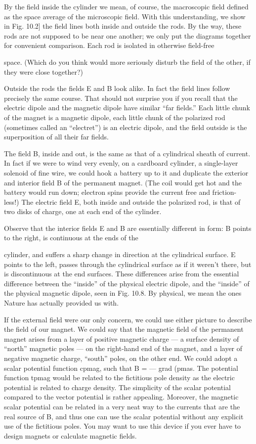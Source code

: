 {{By the field inside the cylinder we mean, of course, the macroscopic
field defined as the space average of the microscopic field.
With this understanding, we show in Fig. 10.2] the field lines both
inside and outside the rods. By the way, these rods are not supposed
to be near one another; we only put the diagrams together for convenient
comparison. Each rod is isolated in otherwise field-free

space. (Which do you think would more seriously disturb the field
of the other, if they were close together?)

Outside the rods the fields E and B look alike. In fact the field
lines follow precisely the same course. That should not surprise
you if you recall that the electric dipole and the magnetic dipole have
similar ``far fields.'' Each little chunk of the magnet is a magnetic
dipole, each little chunk of the polarized rod (sometimes called an
``electret'') is an electric dipole, and the field outside is the superposition
of all their far fields.

The field B, inside and out, is the same as that of a cylindrical
sheath of current. In fact if we were to wind very evenly, on a cardboard
cylinder, a single-layer solenoid of fine wire, we could hook
a battery up to it and duplicate the exterior and interior field B of
the permanent magnet. (The coil would get hot and the battery
would run down; electron spins provide the current free and friction-
less!) The electric field E, both inside and outside the polarized rod,
is that of two disks of charge, one at each end of the cylinder.

Observe that the interior fields E and B are essentially different
in form: B points to the right, is continuous at the ends of the

cylinder, and suffers a sharp change in direction at the cylindrical
surface. E points to the left, passes through the cylindrical surface
as if it weren't there, but is discontinuous at the end surfaces. These
differences arise from the essential difference between the ``inside''
of the physical electric dipole, and the ``inside'' of the physical magnetic
dipole, seen in Fig. 10.8. By physical, we mean the ones
Nature has actually provided us with.

If the external field were our only concern, we could use either
picture to describe the field of our magnet. We could say that the
magnetic field of the permanent magnet arises from a layer of positive
magnetic charge --- a surface density of ``north'' magnetic poles --- 
on the right-hand end of the magnet, and a layer of negative magnetic
charge, ``south'' poles, on the other end. We could adopt a scalar
potential function cpmag, such that B =  --- grad (pmas. The potential
function tpmag would be related to the fictitious pole density as the
electric potential is related to charge density. The simplicity of the
scalar potential compared to the vector potential is rather appealing.
Moreover, the magnetic scalar potential can be related in a very neat
way to the currents that are the real source of B, and thus one can use
the scalar potential without any explicit use of the fictitious poles.
You may want to use this device if you ever have to design magnets
or calculate magnetic fields.

}}
